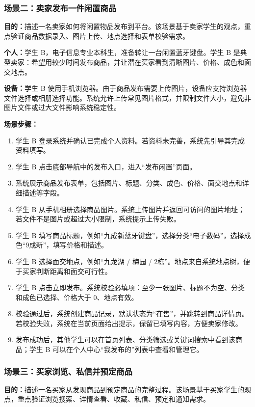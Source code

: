 ﻿\documentclass[UTF8,a4paper,12pt]{ctexart}
\begin{document}
\subsubsection{场景二：卖家发布一件闲置商品}
\textbf{目的：}描述一名卖家如何将闲置物品发布到平台。该场景基于卖家学生的观点，重点验证商品数据录入、图片上传、地点选择和表单校验需求。

\textbf{个人：}学生 B，电子信息专业本科生，准备转让一台闲置蓝牙键盘。学生 B 是典型卖家：希望用较少时间发布商品，并让潜在买家看到清晰图片、价格、成色和面交地点。

\textbf{设备：}学生 B 使用手机浏览器。由于商品发布需要上传图片，设备应支持浏览器文件选择或相册选择功能。系统允许上传常见图片格式，并限制文件大小，避免非图片文件或过大文件影响系统稳定性。

\textbf{场景步骤：}
\begin{enumerate}
  \item 学生 B 登录系统并确认已完成个人资料。若资料未完善，系统先引导其完成资料填写。
  \item 学生 B 点击底部导航中的发布入口，进入“发布闲置”页面。
  \item 系统展示商品发布表单，包括图片、标题、分类、成色、价格、面交地点和详细描述等字段。
  \item 学生 B 从手机相册选择商品图片。系统上传图片并返回可访问的图片地址；若文件不是图片或超过大小限制，系统提示上传失败。
  \item 学生 B 填写商品标题，例如“九成新蓝牙键盘”，选择分类“电子数码”，选择成色“9成新”，填写价格和描述。
  \item 学生 B 选择面交地点，例如“九龙湖 / 梅园 / 2栋”。地点来自系统地点树，便于买家判断距离和面交可行性。
  \item 学生 B 点击立即发布。系统校验必填项：至少一张图片、标题不为空、分类和成色已选择、价格大于 0、地点有效。
  \item 校验通过后，系统创建商品记录，默认状态为“在售”，并跳转到商品详情页。若校验失败，系统在当前页面给出提示，保留已填写内容，方便卖家修改。
  \item 发布成功后，其他学生可以在首页列表、分类筛选或关键词搜索中看到该商品；学生 B 可以在个人中心“我发布的”列表中查看和管理它。
\end{enumerate}

\subsubsection{场景三：买家浏览、私信并预定商品}
\textbf{目的：}描述一名买家从发现商品到预定商品的完整过程。该场景基于买家学生的观点，重点验证浏览搜索、详情查看、收藏、私信、预定和通知需求。
\end{document}
